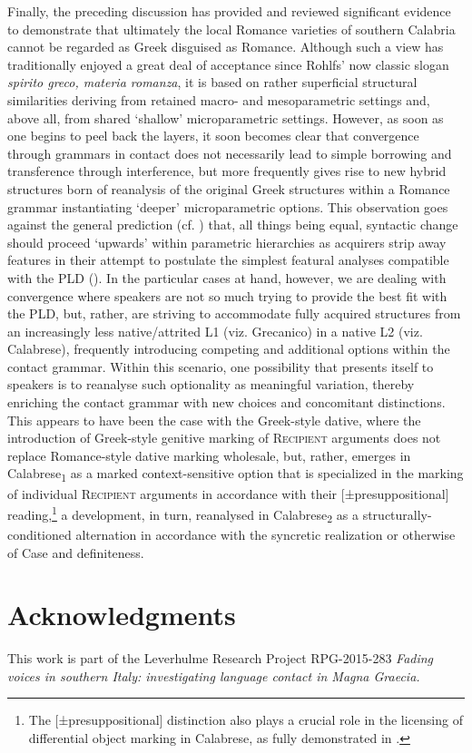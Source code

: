 \documentclass[output=paper,modfonts,nonflat]{langsci/langscibook}
\begin{document}
Finally, the preceding discussion has provided and reviewed significant evidence to demonstrate that ultimately the local Romance varieties of southern Calabria cannot be regarded as Greek disguised as Romance. Although such a view has traditionally enjoyed a great deal of acceptance since Rohlfs’ now classic slogan \textit{spirito greco, materia romanza}, it is based on rather superficial structural similarities deriving from retained macro- and mesoparametric settings and, above all, from shared `shallow' microparametric settings. However, as soon as one begins to peel back the layers, it soon becomes clear that convergence through grammars in contact does not necessarily lead to simple borrowing and transference through interference, but more frequently gives rise to new hybrid structures born of reanalysis of the original Greek structures within a Romance grammar instantiating `deeper' microparametric options. This observation goes against the general prediction (cf. \citealt{Biberauer2012}) that, all things being equal, syntactic change should proceed `upwards' within parametric hierarchies as acquirers strip away features in their attempt to postulate the simplest featural analyses compatible with the PLD (\citealt{Roberts2003}). In the particular cases at hand, however, we are dealing with convergence where speakers are not so much trying to provide the best fit with the PLD, but, rather, are striving to accommodate fully acquired structures from an increasingly less native/attrited L1 (viz. Grecanico) in a native L2 (viz. Calabrese), frequently introducing competing and additional options within the contact grammar. Within this scenario, one possibility that presents itself to speakers is to reanalyse such optionality as meaningful variation, thereby enriching the contact grammar with new choices and concomitant distinctions. This appears to have been the case with the Greek-style dative, where the introduction of Greek-style genitive marking of R\textsc{ecipient} arguments does not replace Romance-style dative marking wholesale, but, rather, emerges in Calabrese\textsubscript{1} as a marked context-sensitive option that is specialized in the marking of individual \textsc{Recipient} arguments in accordance with their [±presuppositional] reading,\footnote{The [±presuppositional] distinction also plays a crucial role in the licensing of differential object marking in Calabrese, as fully demonstrated in \citet{LedgewaySchifanoSilvestriInpress}.} a development, in turn, reanalysed in Calabrese\textsubscript{2} as a structurally-conditioned alternation in accordance with the syncretic realization or otherwise of Case and definiteness.

\section*{Acknowledgments}
This work is part of the Leverhulme Research Project RPG-2015-283 \textit{Fading voices in southern Italy: investigating language contact in Magna Graecia.}

\sloppy
\printbibliography[heading=subbibliography,notkeyword=this] 
\end{document}
